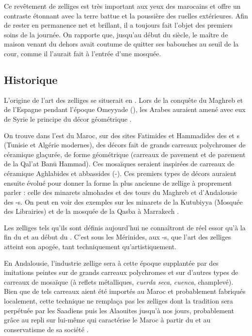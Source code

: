 Ce revêtement de zelliges est très important aux yeux des marocains 
et offre un contraste étonnant avec la terre battue et la poussière 
des ruelles extérieures. Afin de rester en permanence net et brillant, 
il a toujours fait l'objet des premiers soins de la journée. On 
rapporte que, jusqu'au début du siècle, le maître de maison venant du 
dehors avait coutume de quitter ses babouches au seuil de la cour, 
comme il l'aurait fait à l'entrée d'une mosquée.

\subsection{Historique}
L'origine de l'art des zelliges se situerait en . 
Lors de la conquête du Maghreb et de l'Espagne pendant l'époque 
Omeyyade (), les Arabes auraient amené avec eux de 
Syrie le principe du décor géométrique \autocite{Damluji_1993a}.

On trouve dans l'est du Maroc, sur des sites Fatimides et Hammadides 
des  et s (Tunisie et Algérie modernes), des 
décors fait de grands carreaux polychromes de céramique glaçurée, de 
forme géométrique (carreaux de pavement et de parement de la Qal'at 
Ban\=u Hammad). Ces mosaïques seraient inspirées de carreaux de 
céramique Aghlabides et abbassides (-). Ces 
premiers types de décors auraient ensuite évolué pour donner la 
forme la plus ancienne de zellige à proprement parler : celle des 
minarets almohades et des tours du Maghreb et d'Andalousie des
-s. On peut en voir des exemples 
 sur les minarets de la 
Kutubiyya (Mosquée des Librairies) et de la mosquée de la Qasba à 
Marrakech \autocite{Damluji_1993a}.

Les zelliges tels qu'ils sont définis aujourd'hui  ne connaîtront de réel essor qu'à la fin du 
 et au début du . C'est sous les Mérinides, 
aux -s, que l'art des zelliges atteint son 
apogée, tant techniquement qu'artistiquement.

En Andalousie, l'industrie zellige sera à cette époque supplantée 
par des imitations peintes sur de grands carreaux polychromes et 
sur d'autres types de carreaux de mosaïque (à reflets métalliques, 
\emph{cuerda seca}, \emph{cuenca}, champlevé). Bien que de tels 
carreaux aient été importés au Maroc et probablement fabriqués 
localement, cette technique ne remplaça pas les zelliges dont la 
tradition sera perpétuée par les Saadiens puis les Alaouites jusqu'à 
nos jours, probablement grâce au repli sur lui-même qui caractérise 
le Maroc à partir du  et au conservatisme de sa société 
\autocite{Damluji_1993a}.

